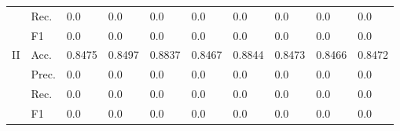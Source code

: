 \begin{tabular}{clllllllll}
                                      & Rec.                                                 & 0.0                    & 0.0                    & 0.0                         & 0.0                    & 0.0                                                                         & 0.0                                                                        & 0.0                                      & 0.0                                      \\
                                      & F1                                                   & 0.0                    & 0.0                    & 0.0                         & 0.0                    & 0.0                                                                         & 0.0                                                                        & 0.0                                      & 0.0                                      \\ 
    \midrule
    \multirow{4}{*}{II}               & Acc.                                                 & 0.8475                  & 0.8497                  & 0.8837                       & 0.8467                  & 0.8844                                                                       & 0.8473                                                                      & 0.8466                                    & 0.8472                                    \\
                                      & Prec.                                                & 0.0                    & 0.0                    & 0.0                         & 0.0                    & 0.0                                                                         & 0.0                                                                        & 0.0                                      & 0.0                                      \\
                                      & Rec.                                                 & 0.0                    & 0.0                    & 0.0                         & 0.0                    & 0.0                                                                         & 0.0                                                                        & 0.0                                      & 0.0                                      \\
                                      & F1                                                   & 0.0                    & 0.0                    & 0.0                         & 0.0                    & 0.0                                                                         & 0.0                                                                        & 0.0                                      & 0.0                                      \\ 

\end{tabular}
